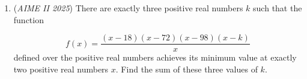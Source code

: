 \begin{enumerate}
	\item (\textit{AIME II 2025}) There are exactly three positive real numbers $k$ such that the function

 \[f(x)=\frac{(x-18)(x-72)(x-98)(x-k)}{x}\] defined over the positive real numbers achieves its minimum value at exactly two positive real numbers $x$. Find the sum of these three values of $k$.


 

\end{enumerate}